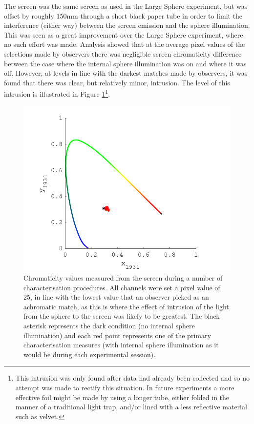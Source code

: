 The screen was the same screen as used in the Large Sphere experiment, but was offset by roughly 150mm through a short black paper tube in order to limit the interference (either way) between the screen emission and the sphere illumination. This was seen as a great improvement over the Large Sphere experiment, where no such effort was made. Analysis showed that at the average pixel values of the selections made by observers there was negligible screen chromaticity difference between the case where the internal sphere illumination was on and where it was off. However, at levels in line with the darkest matches made by observers, it was found that there was clear, but relatively minor, intrusion. The level of this intrusion is illustrated in Figure \ref{fig:SSA}\footnote{This intrusion was only found after data had already been collected and so no attempt was made to rectify this situation. In future experiments a more effective foil might be made by using a longer tube, either folded in the manner of a traditional light trap, and/or lined with a less reflective material such as velvet.}.

\begin{figure}[htbp]
\includegraphics[max width=\textwidth,center]{figs/SmallSphere/ScreenShieldingAnalysis.pdf}
\caption{Chromaticity values measured from the screen during a number of characterisation procedures. All channels were set a pixel value of 25, in line with the lowest value that an observer picked as an achromatic match, as this is where the effect of intrusion of the light from the sphere to the screen was likely to be greatest. The black asterisk represents the dark condition (no internal sphere illumination) and each red point represents one of the primary characterisation measures (with internal sphere illumination as it would be during each experimental session).}
\label{fig:SSA}
\end{figure}

